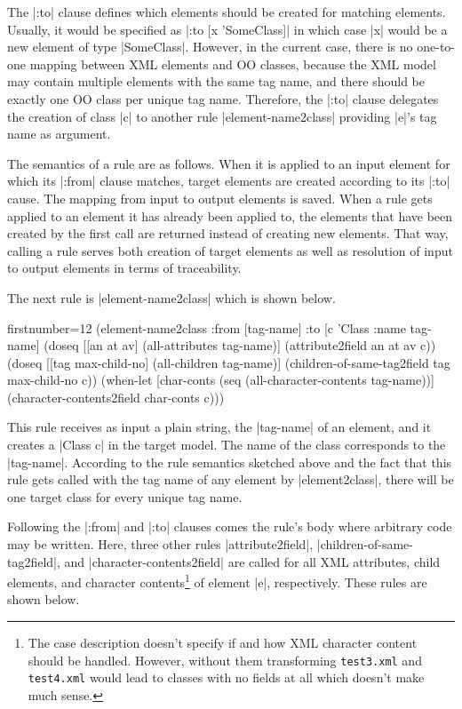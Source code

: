 \documentclass[a4paper]{article}
\newcommand{\code}{\clojureinline}
\begin{document}
The \code|:to| clause defines which elements should be created for matching
elements.  Usually, it would be specified as \code|:to [x 'SomeClass]| in which
case \code|x| would be a new element of type \code|SomeClass|.  However, in the
current case, there is no one-to-one mapping between XML elements and OO
classes, because the XML model may contain multiple elements with the same tag
name, and there should be exactly one OO class per unique tag name.  Therefore,
the \code|:to| clause delegates the creation of class \code|c| to another rule
\code|element-name2class| providing \code|e|'s tag name as argument.

The semantics of a rule are as follows.  When it is applied to an input element
for which its \code|:from| clause matches, target elements are created
according to its \code|:to| cause.  The mapping from input to output elements
is saved.  When a rule gets applied to an element it has already been applied
to, the elements that have been created by the first call are returned instead
of creating new elements.  That way, calling a rule serves both creation of
target elements as well as resolution of input to output elements in terms of
traceability.

The next rule is \code|element-name2class| which is shown below.

\begin{clojurecode*}{firstnumber=12}
  (element-name2class
   :from [tag-name]
   :to   [c 'Class {:name tag-name}]
   (doseq [[an at av] (all-attributes tag-name)]
     (attribute2field an at av c))
   (doseq [[tag max-child-no] (all-children tag-name)]
     (children-of-same-tag2field tag max-child-no c))
   (when-let [char-conts (seq (all-character-contents tag-name))]
     (character-contents2field char-conts c)))
\end{clojurecode*}

This rule receives as input a plain string, the \code|tag-name| of an element,
and it creates a \code|Class c| in the target model.  The name of the class
corresponds to the \code|tag-name|.  According to the rule semantics sketched
above and the fact that this rule gets called with the tag name of any element
by \code|element2class|, there will be one target class for every unique tag
name.

Following the \code|:from| and \code|:to| clauses comes the rule's body where
arbitrary code may be written.  Here, three other rules \code|attribute2field|,
\code|children-of-same-tag2field|, and \code|character-contents2field| are
called for all XML attributes, child elements, and character
contents\footnote{The case description doesn't specify if and how XML character
  content should be handled.  However, without them transforming
  \texttt{test3.xml} and \texttt{test4.xml} would lead to classes with no
  fields at all which doesn't make much sense.}  of element \code|e|,
respectively.  These rules are shown below.
\end{document}
